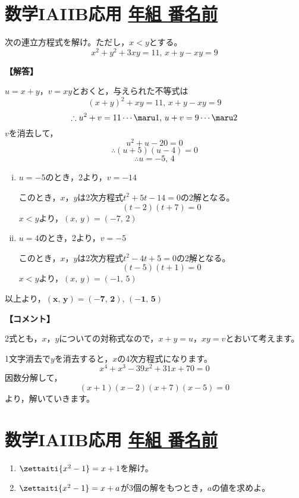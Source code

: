 \documentclass[b5j]{jarticle}
\def\Name#1{\section{\large\bf  #1\hfill
\underline{ \hspace{1zw}年\hspace{2zw}組\hspace{2zw}
番名前\hspace{12zw}}}}
\begin{document}
\newpage

\Name{数学IAIIB応用}
\hakosyokika
次の連立方程式を解け。ただし，$x<y$とする。
$$x^{2}+y^{2}+3xy=11,\,x+y-xy=9$$



\begin{multicols*}{2}
{\bf 【解答】}

$u=x+y$，$v=xy$とおくと，与えられた不等式は
$$(x+y)^{2}+xy=11,\,x+y-xy=9$$
$$\therefore u^{2}+v=11\cdots\maru1,\,u+v=9\cdots\maru2$$
$v$を消去して，
$$u^{2}+u-20=0$$
$$\therefore (u+5)(u-4)=0$$
$$\therefore u=-5,\,4$$

\begin{enumerate}[(i)]
\item $u=-5$のとき，\maru2より，$v=-14$

このとき，$x$，$y$は2次方程式$t^{2}+5t-14=0$の2解となる。
$$(t-2)(t+7)=0$$
$x<y$より，$(x,\,y)=(-7,\,2)$

\item $u=4$のとき，\maru2より，$v=-5$

このとき，$x$，$y$は2次方程式$t^{2}-4t+5=0$の2解となる。
$$(t-5)(t+1)=0$$
$x<y$より，$(x,\,y)=(-1,\,5)$


\end{enumerate}
以上より，$\bm{(x,\,y)=(-7,\,2),\,(-1,\,5)}$


{\bf 【コメント】}

2式とも，$x$，$y$についての対称式なので，$x+y=u$，$xy=v$とおいて考えます。

1文字消去で$y$を消去すると，$x$の4次方程式になります。
$$x^4+x^3-39x^2+31x+70=0$$
因数分解して，
$$(x+1)(x-2)(x+7)(x-5)=0$$
より，解いていきます。
\end{multicols*}



\newpage

\Name{数学IAIIB応用}
\hakosyokika
\begin{enumerate}
\item $\zettaiti{x^{2}-1}=x+1$を解け。
\item $\zettaiti{x^{2}-1}=x+a$が3個の解をもつとき，$a$の値を求めよ。
\end{enumerate}%

\end{document}
